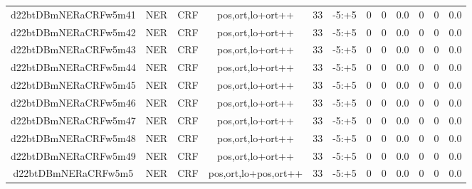 \documentclass[a4paper]{article}
\begin{document}
\begin{landscape}
\begin{center}
\begin{tabular}{ |c|c|c|c|c|c|c|c|c|c|c|c|}
 
 	
 	\small{ d22btDBmNERaCRFw5m41 } & \small{ NER} & \small{  CRF }  & pos,ort,lo+ort++  &  33 &  \small{  -5:+5 }  &  0 & 0 & 0.0  &  0 & 0 & 0.0 \\
 	

 
 	
 	\small{ d22btDBmNERaCRFw5m42 } & \small{ NER} & \small{  CRF }  & pos,ort,lo+ort++  &  33 &  \small{  -5:+5 }  &  0 & 0 & 0.0  &  0 & 0 & 0.0 \\
 	

 
 	
 	\small{ d22btDBmNERaCRFw5m43 } & \small{ NER} & \small{  CRF }  & pos,ort,lo+ort++  &  33 &  \small{  -5:+5 }  &  0 & 0 & 0.0  &  0 & 0 & 0.0 \\
 	

 
 	
 	\small{ d22btDBmNERaCRFw5m44 } & \small{ NER} & \small{  CRF }  & pos,ort,lo+ort++  &  33 &  \small{  -5:+5 }  &  0 & 0 & 0.0  &  0 & 0 & 0.0 \\
 	

 
 	
 	\small{ d22btDBmNERaCRFw5m45 } & \small{ NER} & \small{  CRF }  & pos,ort,lo+ort++  &  33 &  \small{  -5:+5 }  &  0 & 0 & 0.0  &  0 & 0 & 0.0 \\
 	

 
 	
 	\small{ d22btDBmNERaCRFw5m46 } & \small{ NER} & \small{  CRF }  & pos,ort,lo+ort++  &  33 &  \small{  -5:+5 }  &  0 & 0 & 0.0  &  0 & 0 & 0.0 \\
 	

 
 	
 	\small{ d22btDBmNERaCRFw5m47 } & \small{ NER} & \small{  CRF }  & pos,ort,lo+ort++  &  33 &  \small{  -5:+5 }  &  0 & 0 & 0.0  &  0 & 0 & 0.0 \\
 	

 
 	
 	\small{ d22btDBmNERaCRFw5m48 } & \small{ NER} & \small{  CRF }  & pos,ort,lo+ort++  &  33 &  \small{  -5:+5 }  &  0 & 0 & 0.0  &  0 & 0 & 0.0 \\
 	

 
 	
 	\small{ d22btDBmNERaCRFw5m49 } & \small{ NER} & \small{  CRF }  & pos,ort,lo+ort++  &  33 &  \small{  -5:+5 }  &  0 & 0 & 0.0  &  0 & 0 & 0.0 \\
 	

 
 	
 	\small{ d22btDBmNERaCRFw5m5 } & \small{ NER} & \small{  CRF }  & pos,ort,lo+pos,ort++  &  33 &  \small{  -5:+5 }  &  0 & 0 & 0.0  &  0 & 0 & 0.0 \\
 	


\end{tabular}
\end{center}
\end{landscape}
\end{document}

